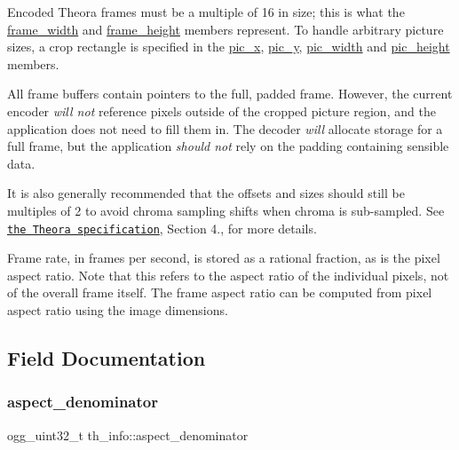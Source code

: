 Encoded Theora frames must be a multiple of 16 in size; this is what the \hyperlink{structth__info_a6b8087a4d831da53011a43b8d74087a0}{frame\+\_\+width} and \hyperlink{structth__info_a6b1adc3a16a8336a72692b0a5937214c}{frame\+\_\+height} members represent. To handle arbitrary picture sizes, a crop rectangle is specified in the \hyperlink{structth__info_a5b3f834bcf141564e7bb14f49101870f}{pic\+\_\+x}, \hyperlink{structth__info_a8aacc575cab2dfe3735001c2ad32aa14}{pic\+\_\+y}, \hyperlink{structth__info_a5048edf77b141dd3e9a92ca85e317345}{pic\+\_\+width} and \hyperlink{structth__info_a775178474283c5990ba73f9ba7f6b88b}{pic\+\_\+height} members.

All frame buffers contain pointers to the full, padded frame. However, the current encoder {\itshape will not} reference pixels outside of the cropped picture region, and the application does not need to fill them in. The decoder {\itshape will} allocate storage for a full frame, but the application {\itshape should not} rely on the padding containing sensible data.

It is also generally recommended that the offsets and sizes should still be multiples of 2 to avoid chroma sampling shifts when chroma is sub-\/sampled. See \href{http://www.theora.org/doc/Theora.pdf}{\tt the Theora specification}, Section 4., for more details.

Frame rate, in frames per second, is stored as a rational fraction, as is the pixel aspect ratio. Note that this refers to the aspect ratio of the individual pixels, not of the overall frame itself. The frame aspect ratio can be computed from pixel aspect ratio using the image dimensions. 

\subsection{Field Documentation}
\mbox{\label{structth__info_a04c0bd477222d747a76085d8720322e2}} 
\subsubsection{\texorpdfstring{aspect\+\_\+denominator}{aspect\_denominator}}
{\footnotesize\ttfamily ogg\+\_\+uint32\+\_\+t th\+\_\+info\+::aspect\+\_\+denominator}

\mbox{\label{structth__info_a5be65dac9f75e37864cf73dd543570cd}} 
